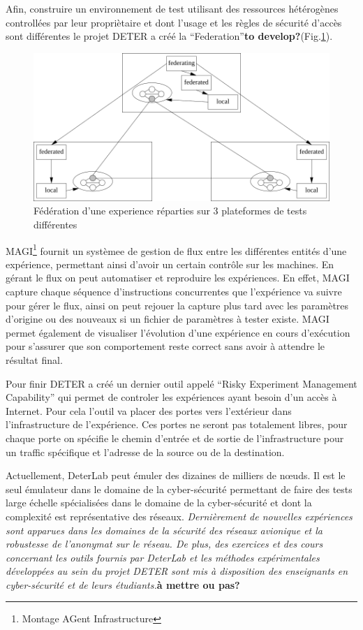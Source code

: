 Afin, construire un environnement de test utilisant des ressources hétérogènes
controllées par leur propriètaire et dont l'usage et les règles de sécurité
d'accès sont différentes le projet DETER a créé la
``Federation''\citep{DETER_faber2007deter}\textbf{to develop?}(Fig.\ref{Federation}).

\begin{figure}
  \centering \includegraphics[scale=0.75]{Pictures/png/Deter_federation}
  \caption{Fédération d'une experience réparties sur 3 plateformes de tests différentes}
  \label{Federation}
\end{figure}

MAGI\footnote{Montage AGent Infrastructure} fournit un systèmee de gestion de
flux entre les différentes entités d'une expérience, permettant ainsi d'avoir un
certain contrôle sur les machines. En gérant le flux on peut automatiser et
reproduire les expériences. En effet, MAGI capture chaque séquence
d'instructions concurrentes que l'expérience va suivre pour gérer le flux, ainsi
on peut rejouer la capture plus tard avec les paramètres d'origine ou des
nouveaux si un fichier de paramètres à tester existe. MAGI permet également de
visualiser l'évolution d'une expérience en cours d'exécution pour s'assurer que
son comportement reste correct sans avoir à attendre le résultat final.

Pour finir DETER a créé un dernier outil appelé ``Risky Experiment Management
Capability'' qui permet de controler les expériences ayant besoin d'un accès à
Internet. Pour cela l'outil va placer des portes vers l'extérieur dans
l'infrastructure de l'expérience. Ces portes ne seront pas totalement libres,
pour chaque porte on spécifie le chemin d'entrée et de sortie de
l'infrastructure pour un traffic spécifique et l'adresse de la source ou de la
destination.

 Actuellement, DeterLab peut émuler des dizaines de milliers de n\oe uds. Il est
 le seul émulateur dans le domaine de la cyber-sécurité permettant de faire des
 tests large échelle spécialisées dans le domaine de la cyber-sécurité et dont
 la complexité est représentative des réseaux. \textit{Dernièrement de nouvelles
 expériences sont apparues dans les domaines de la sécurité des réseaux
 avionique et la robustesse de l'anonymat sur le réseau. De plus, des exercices
 et des cours concernant les outils fournis par DeterLab et les méthodes
 expérimentales développées au sein du projet DETER sont mis à disposition des
 enseignants en cyber-sécurité et de leurs étudiants.}\textbf{à mettre ou pas?}
